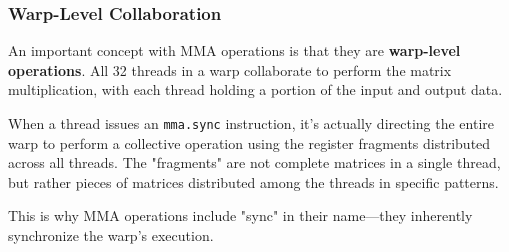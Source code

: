 \subsubsection{Warp-Level Collaboration}

An important concept with MMA operations is that they are \textbf{warp-level operations}. All 32 threads in a warp collaborate to perform the matrix multiplication, with each thread holding a portion of the input and output data.

When a thread issues an \texttt{mma.sync} instruction, it's actually directing the entire warp to perform a collective operation using the register fragments distributed across all threads. The "fragments" are not complete matrices in a single thread, but rather pieces of matrices distributed among the threads in specific patterns.

This is why MMA operations include "sync" in their name—they inherently synchronize the warp's execution.


